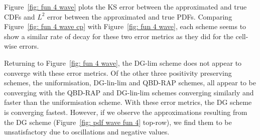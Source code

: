 \begin{example}
Figure~\ref{fig: fun 4 wave} plots the KS error between the approximated and true CDFs and \(L^2\) error between the approximated and true PDFs. Comparing Figure~\ref{fig: fun 4 wave cp} with Figure~\ref{fig: fun 4 wave}, each scheme seems to show a similar rate of decay for these two error metrics as they did for the cell-wise errors. 

Returning to Figure~\ref{fig: fun 4 wave}, the DG-lim scheme does not appear to converge with these error metrics. Of the other three positivity preserving schemes, the uniformisation, DG-lin-lim and QBD-RAP schemes, all appear to be converging with the QBD-RAP and  DG-lin-lim schemes converging similarly and faster than the uniformisation scheme. With these error metrics, the DG scheme is converging fastest. However, if we observe the approximations resulting from the DG scheme (Figure~\ref{fig: pdf wave fun 4} top-row), we find them to be unsatisfactory due to oscillations and negative values. 


\end{example}
